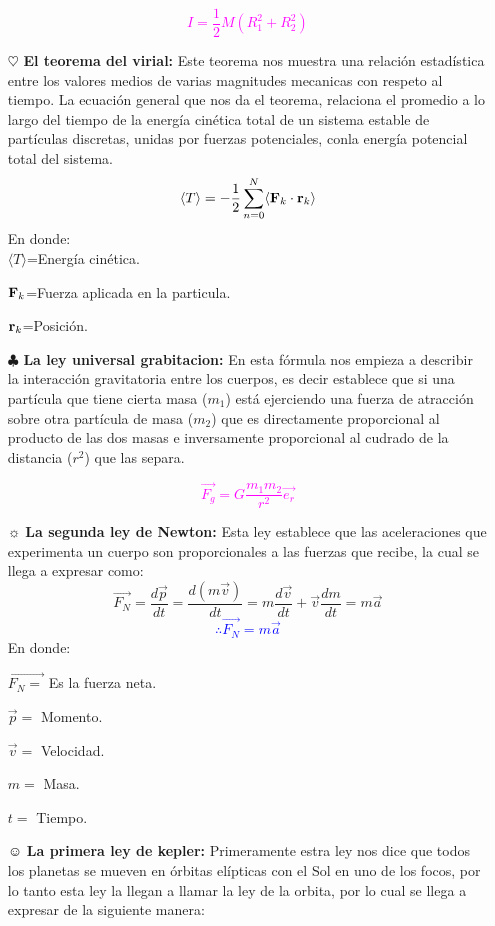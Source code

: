 \documentclass[letterpaper,12pt]{article}
\begin{document}
\begin{itemize}
    \textcolor{magenta}{$$I=\frac{1}{2}M(R^{2}_1+R^{2}_2)$$}
    
     \item[$\heartsuit$] {\textbf{El teorema del virial:}} Este teorema nos muestra una relación estadística entre los valores medios de varias magnitudes mecanicas con respeto al tiempo. La ecuación general que nos da el teorema, relaciona el promedio a lo largo del tiempo de la energía cinética total de un sistema estable de partículas discretas, unidas por fuerzas potenciales, conla energía potencial total del sistema.
    \textcolor{blue}{$$\langle T\rangle=-\frac{1}{2}\sum_{n=0}^{N}\langle {\textbf F}_k \cdot{\textbf r}_k\rangle $$}
    En donde: \\
    $\langle T\rangle$=Energía cinética.
    
    ${\textbf F}_k$=Fuerza aplicada en la particula.
     
      ${\textbf r}_k$=Posición.
      
    \item[$\clubsuit$]{\textbf {La ley universal grabitacion:}} En esta fórmula nos empieza a describir la interacción gravitatoria entre los cuerpos, es decir establece que si una partícula que tiene cierta masa ($m_1$) está ejerciendo una fuerza de atracción sobre otra partícula de masa ($m_2$) que es directamente proporcional al producto de las dos masas e inversamente proporcional al cudrado de la distancia ($r^{2}$) que las separa.
    
    \textcolor{magenta}{$$\vec{F_g}=G\frac{m_1m_2}{r^{2}}\vec{e_r}$$}
     \item[$\sun$]{\textbf {La segunda ley de Newton:}} Esta ley establece que las aceleraciones que experimenta un cuerpo son proporcionales a las fuerzas que recibe, la cual se llega a expresar como:
     $$\vec{F_N}=\frac{d\vec {p}}{dt}=\frac{d(m\vec {v})}{dt}=m\frac{d\vec {v}}{dt}+\vec {v}\frac{dm}{dt}={m\vec {a}}$$
     {\textcolor{blue}{$$\therefore \vec{F_N}=m\vec {a}$$}}
     En donde:
     
     $\vec{F_N=}$ Es la fuerza neta.
     
     $\vec{p}=$ Momento.
     
     $\vec{v}=$ Velocidad.
     
     $m=$ Masa.
     
     $t=$ Tiempo.
     
     \item[$\smiley$]{\textbf {La primera ley de kepler:}} Primeramente estra ley nos dice que todos los planetas se mueven en órbitas elípticas con el Sol en uno de los focos, por lo tanto esta ley la llegan a llamar la ley de la orbita, por lo cual se llega a expresar de la siguiente manera:
     

\end{itemize}
\end{document}

